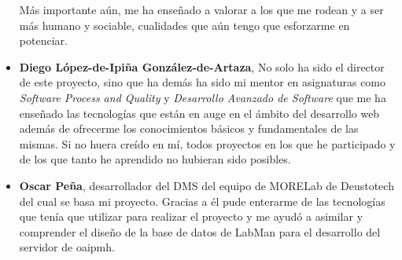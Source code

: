 \begin{itemize}
	Más importante aún, me ha enseñado a valorar a los que me rodean y a ser más humano y sociable, cualidades que aún tengo que esforzarme en potenciar.

	\item \textbf{Diego López-de-Ipiña González-de-Artaza}, No solo ha sido el director de este proyecto, sino que ha demás ha sido mi mentor en asignaturas como \textit{Software Process and Quality} y \textit{Desarrollo Avanzado de Software} que me ha enseñado las tecnologías que están en auge en el ámbito del desarrollo web además de ofrecerme los conocimientos básicos y fundamentales de las mismas. Si no huera creído en mí, todos proyectos en los que he participado y de los que tanto he aprendido no hubieran sido posibles.

	\item \textbf{Oscar Peña}, desarrollador del DMS del equipo de MORELab de Deustotech del cual se basa mi proyecto. Gracias a él pude enterarme de las tecnologías que tenía que utilizar para realizar el proyecto y me ayudó a asimilar y comprender el diseño de la base de datos de LabMan para el desarrollo del servidor de \acrshort{oaipmh}.

\end{itemize}